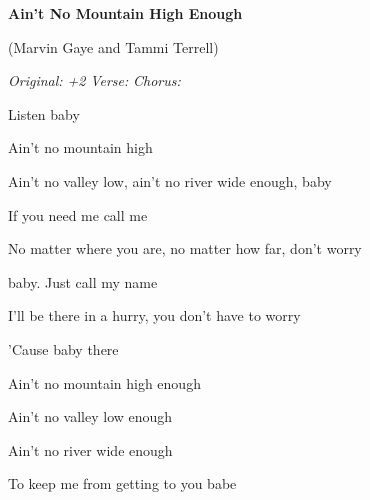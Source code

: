\begin{song}


%
{\centering
    \huge \textbf{Ain’t No Mountain High Enough}\par
    {\vspace{-0.3em}\Large (Marvin Gaye and Tammi Terrell)}\par
    \vspace{0.75ex}
}

\begin{headerbox}
\RaiseBoxWithChucks
\textit{Original: +2} \quad
\textit{Verse: \Down\Miss\Down\Miss\Down\Up\Down\Up} \quad
\textit{Chorus: \Down\Miss\ChuckDown\Miss \Separator \Down\Up\ChuckDown \Separator
\Up\Miss\Up\ChuckDown \Separator \Up\Miss\Up\ChuckDown\Up}
\end{headerbox}

\begin{vchordbox}
\end{vchordbox}

\large

\bigskip

\Intro {}    Listen baby \par

\bigskip

 Ain't no mountain high \par
Ain't no valley low, ain't no river wide enough, baby \par
{} If you need me call me \par
No matter where you are, no matter how far, don't worry \par
{}baby. Just call my name \par
I'll be there in a hurry, you don't have to worry \par
'Cause baby there \par

\bigskip

\begin{chorusbox}{\Chorus}
Ain't no mountain high enough \par
{}Ain't no valley low enough \par
{}Ain't no river wide enough \par
To keep me from getting to you babe \par
\end{chorusbox}


\end{song}
